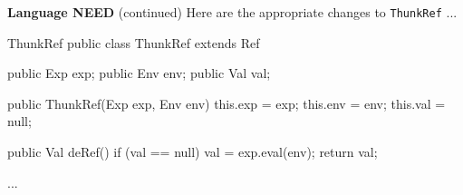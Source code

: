 
\begin{minipage}[t]{\sw}
\slidenumber
\LARGE
{\bf Language NEED} (continued)\exx
\Large
Here are the appropriate changes
to \verb'ThunkRef' ...
\large
\begin{qv}
ThunkRef
public class ThunkRef extends Ref {

    public Exp exp;
    public Env env;
    public Val val;

    public ThunkRef(Exp exp, Env env) {
        this.exp = exp;
        this.env = env;
        this.val = null;
    }

    public Val deRef() {
        if (val == null)
            val = exp.eval(env);
        return val;
    }

...

}
\end{qv}
\end{minipage}
